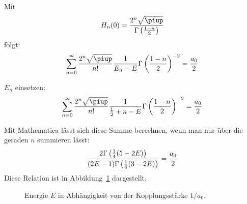 Mit
\[
    H_n(0) = \frac{2^n \sqrt\piup}{\Gamma\del{\frac{1-n}2}}
\]
folgt:
\[
    \sum_{n=0}^\infty \frac{2^n \sqrt\piup}{n!} \frac{1}{E_n -
    E} \Gamma\del{\frac{1-n}2}^{-2} = \frac{a_0}2
\]

$E_n$ einsetzen:
\[
    \sum_{n=0}^\infty \frac{2^n \sqrt\piup}{n!} \frac{1}{\frac 12 + n -
    E} \Gamma\del{\frac{1-n}2}^{-2} = \frac{a_0}2
\]

Mit Mathematica lässt sich diese Summe berechnen, wenn man nur über die geraden
$n$ summieren lässt:
\[
    \frac{2 \Gamma\del{\frac 14(5-2E)}}{(2E-1)\Gamma\del{\frac 14(3-2E)}}
    = \frac{a_0}2
\]
Diese Relation ist in Abbildung~\ref{fig:E_a0} dargestellt.

\begin{figure}[htbp]
    \centering
    \caption{%
        Energie $E$ in Abhängigkeit von der Kopplungsstärke $1/a_0$.
    }
    \label{fig:E_a0}
\end{figure}

